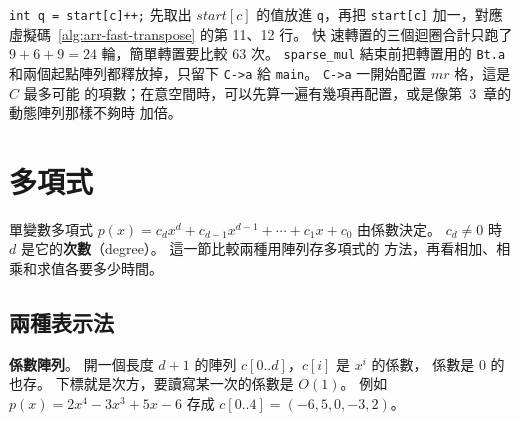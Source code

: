 
\texttt{int q = start[c]++;} 先取出 $\mathit{start}[c]$ 的值放進 \texttt{q}，再把
\texttt{start[c]} 加一，對應虛擬碼~\ref{alg:arr-fast-transpose} 的第 11、12 行。 快
速轉置的三個迴圈合計只跑了 $9 + 6 + 9 = 24$ 輪，簡單轉置要比較 $63$ 次。
\texttt{sparse\_mul} 結束前把轉置用的 \texttt{Bt.a} 和兩個起點陣列都釋放掉，只留下
\texttt{C->a} 給 \texttt{main}。 \texttt{C->a} 一開始配置 $mr$ 格，這是 $C$ 最多可能
的項數；在意空間時，可以先算一遍有幾項再配置，或是像第~3~章的動態陣列那樣不夠時
加倍。

\section{多項式}
\label{sec:arr-poly}

單變數多項式 $p(x) = c_d x^d + c_{d-1} x^{d-1} + \cdots + c_1 x + c_0$ 由係數決定。
$c_d \ne 0$ 時 $d$ 是它的\textbf{次數}（degree）。 這一節比較兩種用陣列存多項式的
方法，再看相加、相乘和求值各要多少時間。

\subsection{兩種表示法}

\textbf{係數陣列}。 開一個長度 $d + 1$ 的陣列 $c[0..d]$，$c[i]$ 是 $x^i$ 的係數，
係數是 $0$ 的也存。 下標就是次方，要讀寫某一次的係數是 $O(1)$。 例如
$p(x) = 2x^4 - 3x^3 + 5x - 6$ 存成 $c[0..4] = (-6, 5, 0, -3, 2)$。

